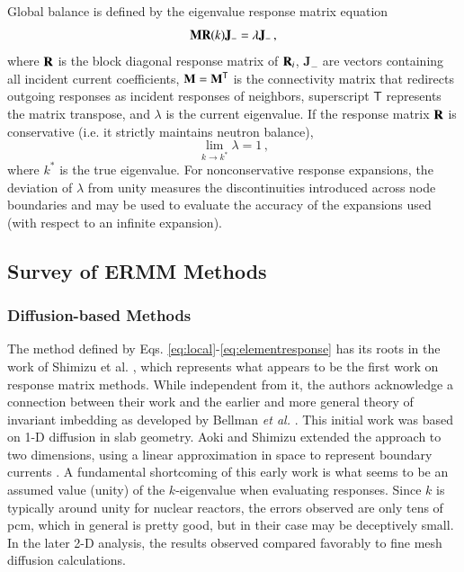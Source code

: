 Global balance is defined by the eigenvalue response matrix
equation
\begin{equation}
  \mathbf{M}\mathbf{R}(k)\mathbf{J_-}  = \lambda \mathbf{J_-} \, ,
  \label{eq:erme}
\end{equation}
where 
$\mathbf{R}$ is the block diagonal response matrix of $\mathbf{R}_i$,  
$\mathbf{J}_{-}$ are vectors containing all incident current coefficients, 
$\mathbf{M}=\mathbf{M}^\mathsf{T}$ is 
the connectivity matrix that redirects outgoing responses as incident
responses of neighbors, superscript $\mathsf{T}$ represents the matrix 
transpose, and $\lambda$ is the current eigenvalue.  
If the response matrix $\mathbf{R}$ is conservative (i.e. it
strictly maintains neutron balance),
\begin{equation}
 \lim_{k\to k^*} \lambda = 1 \, ,
\end{equation}
where $k^*$ is the true eigenvalue.
For nonconservative response expansions, the deviation of $\lambda$ from
unity measures the discontinuities introduced across node boundaries and 
may be used to evaluate the accuracy of the expansions used (with 
respect to an infinite expansion).


\subsection{Survey of ERMM Methods}

\subsubsection{Diffusion-based Methods}

The method defined by
Eqs. \ref{eq:local}-\ref{eq:elementresponse} has its roots in
 the work of Shimizu et al.
\cite{shimizu1963rmm, shimizu1963arm}, 
which represents what appears to be the first work on response 
matrix methods.  While independent from it, the authors 
acknowledge a connection between their work and the earlier and 
more general theory of invariant imbedding as developed by 
Bellman {\it et al.} \cite{bellman1960iim}.  This initial work was 
based on 1-D diffusion in slab geometry. 
Aoki and Shimizu extended the approach to two dimensions, 
using a linear approximation in space to represent boundary
currents \cite{aoki1965arm}.
A fundamental shortcoming of this early work is what seems to
be an assumed value (unity) of the $k$-eigenvalue when evaluating responses.
Since $k$ is typically around unity for nuclear reactors, the errors 
observed are only tens of pcm, which in general is pretty good, but in 
their case may be deceptively small.  In the later 2-D analysis, the 
results observed compared favorably to fine mesh diffusion calculations.


